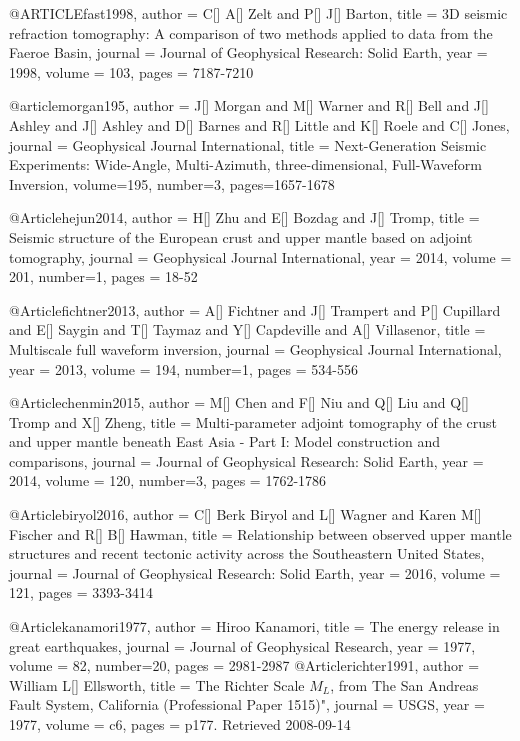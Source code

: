 @ARTICLE{fast1998,
  author = {C[] A[] Zelt and P[] J[] Barton},
  title = {3D seismic refraction tomography: A comparison of two methods applied to data from the Faeroe Basin},
  journal = {Journal of Geophysical Research: Solid Earth},
  year = {1998},
  volume = {103},
  pages = {7187-7210}
}


@article{morgan195,
author = {J[] Morgan and M[] Warner and R[] Bell and J[] Ashley and J[] Ashley and D[] Barnes and R[] Little and K[] Roele and C[] Jones},
journal = {Geophysical Journal International},
title = {Next-Generation Seismic Experiments: Wide-Angle, Multi-Azimuth, three-dimensional, Full-Waveform Inversion},
volume=195,
number=3,
pages=1657-1678
}

@Article{hejun2014,
  author = 	 {H[] Zhu and E[] Bozdag and J[] Tromp},
  title = 	 {Seismic structure of the European crust and upper mantle based on adjoint tomography},
  journal = 	 {Geophysical Journal International},
  year = 	 2014,
  volume = 201,
  number=1,
  pages =	 {18-52}
}

@Article{fichtner2013,
  author = 	 {A[] Fichtner and J[] Trampert and P[] Cupillard and E[] Saygin and T[] Taymaz and Y[] Capdeville and A[] Villasenor},
  title = 	 {Multiscale full waveform inversion},
  journal = 	 {Geophysical Journal International},
  year = 	 2013,
  volume = 194,
  number=1,
  pages =	 {534-556}
}

@Article{chenmin2015,
  author = 	 {M[] Chen and F[] Niu and Q[] Liu and Q[] Tromp and X[] Zheng},
  title = 	 {Multi‐parameter adjoint tomography of the crust and upper mantle beneath {E}ast {A}sia - {P}art I: {M}odel construction and comparisons},
  journal = 	 {Journal of Geophysical Research: Solid Earth},
  year = 	 2014,
  volume = 120,
  number=3,
  pages =	 {1762-1786}
}


@Article{biryol2016,
  author = 	 {C[] Berk Biryol and L[] Wagner and Karen M[] Fischer and R[] B[] Hawman},
  title = 	 {Relationship between observed upper mantle structures and recent tectonic activity across the Southeastern United States},
  journal = 	 {Journal of Geophysical Research: Solid Earth},
  year = 	 2016,
  volume = 121,
  pages =	 {3393-3414}
}

@Article{kanamori1977,
  author = 	 {Hiroo Kanamori},
  title = 	 {The energy release in great earthquakes},
  journal = 	 {Journal of Geophysical Research},
  year = 	 1977,
  volume = 82,
  number=20,
  pages =	 {2981-2987}
}
@Article{richter1991,
  author = 	 {William L[] Ellsworth},
  title = 	 {The Richter Scale $M_L$, from The San Andreas Fault System, California (Professional Paper 1515)"},
  journal = 	 {USGS},
  year = 	 1977,
  volume = c6,
  pages =	 {p177. Retrieved 2008-09-14}
}



